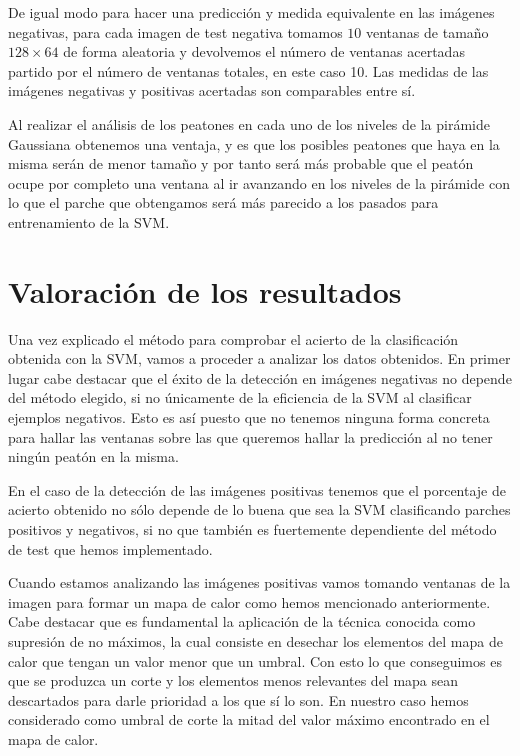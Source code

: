 \documentclass[a4paper,12pt]{article}
\begin{document}
De igual modo para hacer una predicción y medida equivalente en las imágenes negativas, para cada imagen de test negativa tomamos $10$ ventanas de tamaño $128\times 64$ de forma aleatoria y devolvemos el número de ventanas acertadas partido por el número de ventanas totales, en este caso 10. Las medidas de las imágenes negativas y positivas acertadas son comparables entre sí.

Al realizar el análisis de los peatones en cada uno de los niveles de la pirámide Gaussiana obtenemos una ventaja, y es que los posibles peatones que haya en la misma serán de menor tamaño y por tanto será más probable que el peatón ocupe por completo una ventana al ir avanzando en los niveles de la pirámide con lo que el parche que obtengamos será más parecido a los pasados para entrenamiento de la SVM.



\section{Valoración de los resultados} 

Una vez explicado el método para comprobar el acierto de la clasificación obtenida con la SVM, vamos a proceder a analizar los datos obtenidos. En primer lugar cabe destacar que el éxito de la detección en imágenes negativas no depende del método elegido, si no únicamente de la eficiencia de la SVM al clasificar ejemplos negativos. Esto es así puesto que no tenemos ninguna forma concreta para hallar las ventanas sobre las que queremos hallar la predicción al no tener ningún peatón en la misma.

En el caso de la detección de las imágenes positivas tenemos que el porcentaje de acierto obtenido no sólo depende de lo buena que sea la SVM clasificando parches positivos y negativos, si no que también es fuertemente dependiente del método de test que hemos implementado.

Cuando estamos analizando las imágenes positivas vamos tomando ventanas de la imagen para formar un mapa de calor como hemos mencionado anteriormente. Cabe destacar que es fundamental la aplicación de la técnica conocida como supresión de no máximos, la cual consiste en desechar los elementos del mapa de calor que tengan un valor menor que un umbral. Con esto lo que conseguimos es que se produzca un corte y los elementos menos relevantes del mapa sean descartados para darle prioridad a los que sí lo son. En nuestro caso hemos considerado como umbral de corte la mitad del valor máximo encontrado en el mapa de calor. 
\end{document}
